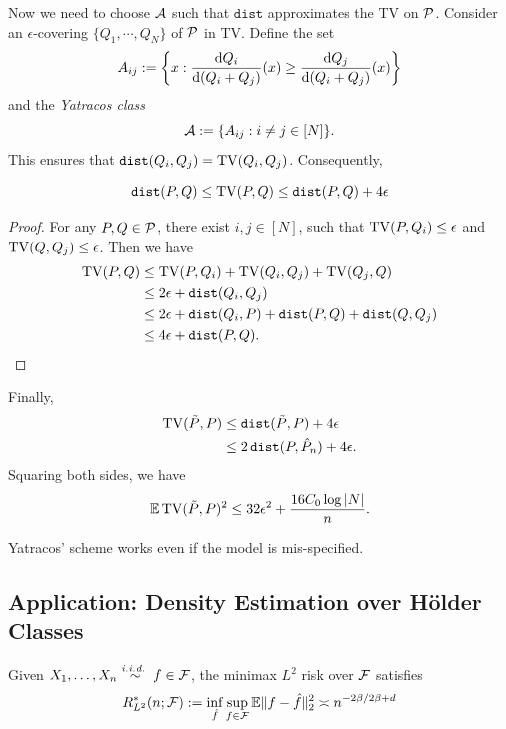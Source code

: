Now we need to choose $\mathcal{A}$ such that $\texttt{dist}$ approximates the TV on $\mathcal{P}$.
Consider an $\epsilon$-covering $\{Q_1,\cdots,Q_N\}$ of $\mathcal{P}$ in TV. Define the set 
\[A_{ij}:=\left\{x:\frac{\mathrm{d} Q_i}{\mathrm{d} (Q_i+Q_j)}(x)\geq \frac{\mathrm{d} Q_j}{\mathrm{d} (Q_i+Q_j)}(x)\right\}\]
and the \textit{Yatracos class} 
\[\mathcal{A}:=\{A_{ij}:i\neq j\in [N]\}.\]
This ensures that $\texttt{dist}(Q_i,Q_j)=\operatorname{TV}(Q_i,Q_j)$. Consequently,
\begin{lemma}
    \[\texttt{dist}(P,Q)\leq \operatorname{TV}(P,Q)\leq \texttt{dist}(P,Q)+4\epsilon\]
\end{lemma}
\begin{proof}
    For any $P,Q\in\mathcal{P}$, there exist $i,j\in [N]$, such that $\operatorname{TV}(P,Q_i)\leq\epsilon$ and $\operatorname{TV}(Q,Q_j)\leq \epsilon$. Then we have
    \begin{align*}
        \operatorname{TV}(P,Q)&\leq \operatorname{TV}(P,Q_i)+\operatorname{TV}(Q_i,Q_j)+\operatorname{TV}(Q_j,Q)\\
                &\leq 2\epsilon + \texttt{dist}(Q_i,Q_j)\\
                &\leq 2\epsilon + \texttt{dist}(Q_i,P) +\texttt{dist}(P,Q)  + \texttt{dist}(Q,Q_j)\\
                &\leq 4\epsilon +\texttt{dist}(P,Q).
    \end{align*}
\end{proof}
Finally, 
\begin{align*}
    \operatorname{TV}(\tilde{P},P)&\leq \texttt{dist}(\tilde{P},P)+4\epsilon\\
                    &\leq 2\, \texttt{dist}(P,\hat{P}_n)+4\epsilon.
\end{align*}
Squaring both sides, we have
\[\mathbb{E}\operatorname{TV}(\tilde{P},P)^2\leq 32\epsilon^2 + \frac{16C_0\log|N|}{n}.\]

\begin{remark}
    Yatracos' scheme works even if the model is mis-specified.
\end{remark}

\subsection{Application: Density Estimation over H\"{o}lder Classes}

\begin{theorem}\label{thm:density-estimation-Holder-l2}
    Given $X_1,\dots,X_n\stackrel{\textit{i.i.d.~}}{\sim}f\in \mathcal{F}$, the minimax $L^2$ risk over $\mathcal{F}$ satisfies
    \[R^*_{L^2}(n;\mathcal{F}):=\inf_{\hat f}\sup_{f\in\mathcal{F}}\mathbb{E}\|f-\hat{f}\|_2^2\asymp n^{-2\beta/2\beta+d}\]
\end{theorem}


